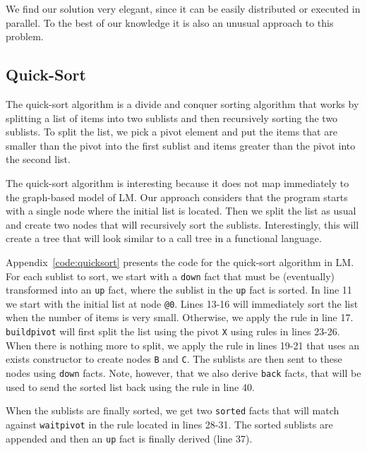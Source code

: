 We find our solution very elegant, since it can be easily distributed or executed in parallel.
To the best of our knowledge it is also an unusual approach to this problem.

\subsection{Quick-Sort}

The quick-sort algorithm is a divide and conquer sorting algorithm that works by splitting
a list of items into two sublists and then recursively sorting the two sublists.
To split the list, we pick a pivot element and put the items that are smaller than the pivot
into the first sublist and items greater than the pivot into the second list.

The quick-sort algorithm is interesting because it does not map immediately to the graph-based
model of LM. Our approach considers that the program starts with a single node where
the initial list is located. Then we split the list as usual and create two nodes
that will recursively sort the sublists. Interestingly, this will create a tree
that will look similar to a call tree in a functional language.

Appendix~\ref{code:quicksort} presents the code for the quick-sort algorithm in LM.
For each sublist to sort, we start with a \texttt{down} fact that must be (eventually)
transformed into an \texttt{up} fact, where the sublist in the \texttt{up} fact is sorted.
In line 11 we start with the initial list at node \texttt{@0}. Lines 13-16 will immediately
sort the list when the number of items is very small. Otherwise, we apply the rule in line 17.
\texttt{buildpivot} will first split the list using the pivot \texttt{X} using rules in
lines 23-26. When there is nothing more to split, we apply the rule in lines 19-21
that uses an exists constructor to create nodes \texttt{B} and \texttt{C}. The sublists
are then sent to these nodes using \texttt{down} facts. Note, however, that we also
derive \texttt{back} facts, that will be used to send the sorted list back using the rule
in line 40.

When the sublists are finally sorted, we get two \texttt{sorted} facts that will match
against \texttt{waitpivot} in the rule located in lines 28-31. The sorted sublists
are appended and then an \texttt{up} fact is finally derived (line 37).

